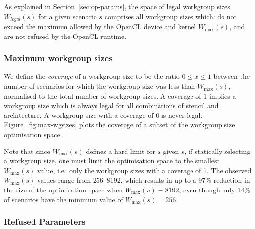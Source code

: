 As explained in Section~\ref{sec:op-params}, the space of legal
workgroup sizes $W_{legal}(s)$ for a given scenario $s$ comprises all
workgroup sizes which: do not exceed the maximum allowed by the OpenCL
device and kernel $W_{\max}(s)$, and are not refused by the OpenCL
runtime.

\subsubsection{Maximum workgroup sizes}

We define the \emph{coverage} of a workgroup size to be the ratio
$0 \le x \le 1$ between the number of scenarios for which the
workgroup size was less than $W_{\max}(s)$, normalised to the total
number of workgroup sizes. A coverage of 1 implies a workgroup size
which is always legal for all combinations of stencil and
architecture. A workgroup size with a coverage of 0 is never
legal. Figure~\ref{fig:max-wgsizes} plots the coverage of a subset of
the workgroup size optimisation space.

Note that since $W_{\max}(s)$ defines a hard limit for a given $s$, if
statically selecting a workgroup size, one must limit the optimisation
space to the smallest $W_{\max}(s)$ value, i.e.\ only the workgroup
sizes with a coverage of 1. The observed $W_{\max}(s)$ values range
from 256--8192, which results in up to a 97\% reduction in the size of
the optimisation space when $W_{\max}(s) = 8192$, even though only
14\% of scenarios have the minimum value of $W_{\max}(s) = 256$.


\subsubsection{Refused Parameters}

\begin{table}
\parbox{.32\linewidth}{
  \centering
  \scriptsize
  
}
\hfill
\parbox{.32\linewidth}{
  \centering
  \scriptsize
  
}
\hfill
\parbox{.32\linewidth}{
  \centering
  \scriptsize
  
}
\caption{%
  The thirty most refused parameters, ranked in descending
  order. There is little correlation between the size of workgroup and the
  likelihood that it is refused, suggesting that the cause of refused
  parameters is not a resource constraint, but a behavioural issue.%
}
\label{tab:top-refused-params}
\end{table}

